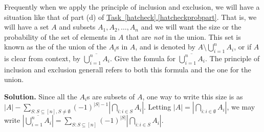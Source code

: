 \documentclass{book}
\begin{document}
\setcounter{project}{224}
\addtocounter{project}{-1}
\begin{activity}[]\label{compunion}
\hypertarget{p-1269}{}%
Frequently when we apply the principle of inclusion and exclusion, we will have a situation like that of part (d) of \hyperref[hatcheckprobpart]{Task~\ref{hatcheck}.\ref{hatcheckprobpart}}.  That is, we will have a set \(A\) and subsets \(A_1, A_2, \ldots, A_n\) and we will want the size or the probability of the set of elements in \(A\) that are \emph{not} in the union.  This set is known as the   of the union of the \(A_i\)s in \(A\), and is denoted by \(A \setminus \bigcup_{i=1}^n A_i\), or if \(A\) is clear from context, by \(\overline{\bigcup_{i=1}^n A_i}\). Give the fomula for \(\overline{\bigcup_{i=1}^n A_i}\).  The principle of inclusion and exclusion generall refers to both this formula and the one for the union.%
\par\smallskip%
\noindent\textbf{Solution.}\hypertarget{solution-160}{}\quad%
\hypertarget{p-1270}{}%
Since all the \(A_i\)s are subsets of \(A\), one way to write this size is as \(|A| - \sum_{S:S \subseteq [n], S \ne \emptyset}(-1)^{|S|-1} |\bigcap_{i:i \in S}A_i|\).  Letting \(|A| = \left|\bigcap_{i:i \in \emptyset} A_i\right|\), we may write \(\left|\overline{\bigcup_{i=1}^n A_i}\right| = \sum_{S:S \subseteq [n]} (-1)^{|S|}\left| \bigcap_{i:i\in S} A_i\right|\).%
\end{activity}
\end{document}

